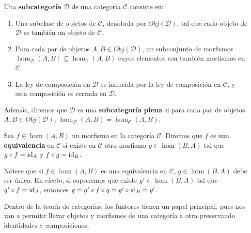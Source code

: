 \begin{definicion}
	Una \textbf{subcategoría} $\mathcal{D}$ de una categoría $\mathcal{C}$
	consiste en:
	\begin{enumerate}
		\item Una subclase de objetos de $\mathcal{C}$, denotada por
		$Obj(\mathcal{D})$, tal que cada objeto de $\mathcal{D}$ es también un objeto
		de $\mathcal{C}$.
		
		\item Para cada par de objetos $A, B \in Obj(\mathcal{D})$, un subconjunto
		de morfismos $\hom_{\mathcal{D}}(A, B) \subseteq \hom_{\mathcal{C}}(A, B)$
		cuyos elementos son también morfismos en $\mathcal{C}$.
		
		\item La ley de composición en $\mathcal{D}$ es inducida por la ley de composición
		en $\mathcal{C}$, y esta composición es cerrada en $\mathcal{D}$.
	\end{enumerate}
	Además, diremos que $\mathcal{D}$ es una \textbf{subcategoría plena} si para cada
	par de objetos $A, B \in Obj(\mathcal{D})$,
	$\hom_{\mathcal{D}}(A, B) = \hom_{\mathcal{C}}(A, B)$.
\end{definicion}

\begin{definicion}
	Sea $f \in \hom(A,B)$ un morfismo en la categoría $\mathcal{C}$. Diremos que
	$f$ es una \textbf{equivalencia} en $\mathcal{C}$ si existe en $\mathcal{C}$ otro
	morfismo $g \in \hom(B,A)$ tal que $g \circ f = \operatorname{id}_{A}$ y $f \circ g = \operatorname{id}_{B}$.
\end{definicion}
\begin{observacion}
	Nótese que si $f \in \hom(A,B)$ es una equivalencia en $\mathcal{C}$,
	$g \in \hom(B,A)$ debe ser única. En efecto, si suponemos que existe
	$g' \in \hom(B,A)$ tal que $g' \circ f = \operatorname{id}_{A}$, entonces $g = g'\circ f \circ
	g = g' \circ \operatorname{id}_{B}= g'$.
\end{observacion}

Dentro de la teoría de categorías, los funtores tienen un papel principal, pues nos
van a permitir llevar objetos y morfismos de una categoría a otra preservando identidades
y composiciones.


